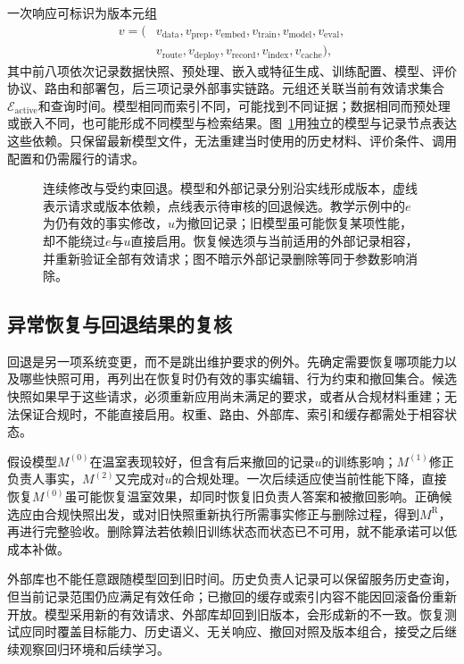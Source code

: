 一次响应可标识为版本元组
\[
\begin{aligned}
v=(&v_{\mathrm{data}},v_{\mathrm{prep}},v_{\mathrm{embed}},
v_{\mathrm{train}},v_{\mathrm{model}},v_{\mathrm{eval}},\\
&v_{\mathrm{route}},v_{\mathrm{deploy}},v_{\mathrm{record}},
v_{\mathrm{index}},v_{\mathrm{cache}}),
\end{aligned}
\]
其中前八项依次记录数据快照、预处理、嵌入或特征生成、训练配置、模型、评价协议、路由和部署包，后三项记录外部事实链路。元组还关联当前有效请求集合$\mathcal E_{\mathrm{active}}$和查询时间。模型相同而索引不同，可能找到不同证据；数据相同而预处理或嵌入不同，也可能形成不同模型与检索结果。图~\ref{fig:ket-update-versions}用独立的模型与记录节点表达这些依赖。只保留最新模型文件，无法重建当时使用的历史材料、评价条件、调用配置和仍需履行的请求。

\begin{figure}[htbp]
\centering

\caption{连续修改与受约束回退。模型和外部记录分别沿实线形成版本，虚线表示请求或版本依赖，点线表示待审核的回退候选。教学示例中的$e$为仍有效的事实修改，$u$为撤回记录；旧模型虽可能恢复某项性能，却不能绕过$e$与$u$直接启用。恢复候选须与当前适用的外部记录相容，并重新验证全部有效请求；图不暗示外部记录删除等同于参数影响消除。}
\label{fig:ket-update-versions}
\end{figure}

\FloatBarrier
\subsection{异常恢复与回退结果的复核}
\label{sec:ket-update-rollback}

回退是另一项系统变更，而不是跳出维护要求的例外。先确定需要恢复哪项能力以及哪些快照可用，再列出在恢复时仍有效的事实编辑、行为约束和撤回集合。候选快照如果早于这些请求，必须重新应用尚未满足的要求，或者从合规材料重建；无法保证合规时，不能直接启用。权重、路由、外部库、索引和缓存都需处于相容状态。

假设模型$M^{(0)}$在温室表现较好，但含有后来撤回的记录$u$的训练影响；$M^{(1)}$修正负责人事实，$M^{(2)}$又完成对$u$的合规处理。一次后续适应使当前性能下降，直接恢复$M^{(0)}$虽可能恢复温室效果，却同时恢复旧负责人答案和被撤回影响。正确候选应由合规快照出发，或对旧快照重新执行所需事实修正与删除过程，得到$M^{\mathrm R}$，再进行完整验收。删除算法若依赖旧训练状态而状态已不可用，就不能承诺可以低成本补做。

外部库也不能任意跟随模型回到旧时间。历史负责人记录可以保留服务历史查询，但当前记录范围仍应满足有效任命；已撤回的缓存或索引内容不能因回滚备份重新开放。模型采用新的有效请求、外部库却回到旧版本，会形成新的不一致。恢复测试应同时覆盖目标能力、历史语义、无关响应、撤回对照及版本组合，接受之后继续观察回归环境和后续学习。

